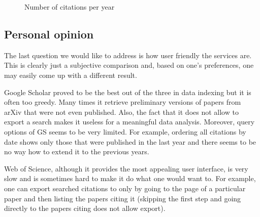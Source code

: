 \documentclass{lmcs}
\begin{document}
\begin{figure}[!h]
\caption{Number of citations per year}
\label{pic:years}
\end{figure}


\subsection{Personal opinion}

The last question we would like to address is how user friendly the services are. This is clearly just a subjective comparison and, based on one's preferences, one may easily come up with a different result.

Google Scholar proved to be the best out of the three in data indexing but it is often too greedy. Many times it retrieve preliminary versions of papers from arXiv that were not even published. Also, the fact that it does not allow to export a search makes it useless for a meaningful data analysis. Moreover, query options of GS seems to be very limited. For example, ordering all citations by date shows only those that were published in the last year and there seems to be no way how to extend it to the previous years.

Web of Science, although it provides the most appealing user interface, is very slow and is sometimes hard to make it do what one would want to. For example, one can export searched citations to \BibTeX{} only by going to the page of a particular paper and then listing the papers citing it (skipping the first step and going directly to the papers citing does not allow \BibTeX{} export).
\end{document}
